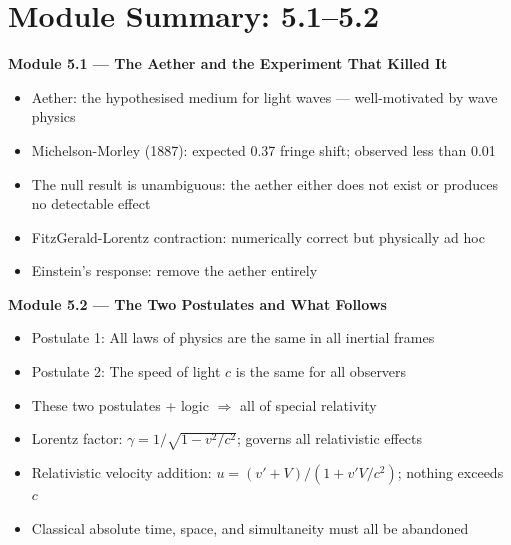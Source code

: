\documentclass[12pt, a4paper, twoside]{book}
\begin{document}
\chapter*{Module Summary: 5.1--5.2}

\begin{tcolorbox}[enhanced,colback=deep!4,colframe=deep,
  title={\bfseries\color{white} Key Ideas: Modules 5.1--5.2},
  attach boxed title to top left={yshift=-2mm,xshift=4mm},
  boxed title style={colback=deep}]
\textbf{Module 5.1 --- The Aether and the Experiment That Killed It}
\begin{itemize}[leftmargin=1.5em,itemsep=2pt]
  \item Aether: the hypothesised medium for light waves --- well-motivated by wave physics
  \item Michelson-Morley (1887): expected 0.37 fringe shift; observed less than 0.01
  \item The null result is unambiguous: the aether either does not exist or produces no detectable effect
  \item FitzGerald-Lorentz contraction: numerically correct but physically ad hoc
  \item Einstein's response: remove the aether entirely
\end{itemize}
\vspace{6pt}
\textbf{Module 5.2 --- The Two Postulates and What Follows}
\begin{itemize}[leftmargin=1.5em,itemsep=2pt]
  \item Postulate 1: All laws of physics are the same in all inertial frames
  \item Postulate 2: The speed of light $c$ is the same for all observers
  \item These two postulates + logic $\Rightarrow$ all of special relativity
  \item Lorentz factor: $\gamma = 1/\sqrt{1-v^2/c^2}$; governs all relativistic effects
  \item Relativistic velocity addition: $u = (v'+V)/(1+v'V/c^2)$; nothing exceeds $c$
  \item Classical absolute time, space, and simultaneity must all be abandoned
\end{itemize}
\end{tcolorbox}

\vspace{0.5cm}
\begin{center}
\end{center}
\end{document}
